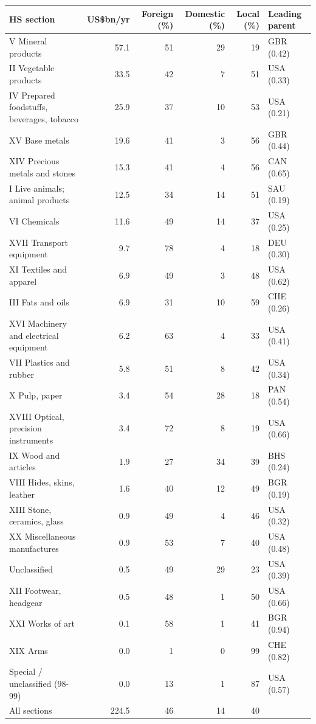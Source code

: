 \begin{tabular}{@{}p{7.2cm} r r r r l@{}}
\toprule
HS section & US\$bn/yr & Foreign (\%) & Domestic (\%) & Local (\%) & Leading parent \\
\midrule
V Mineral products & 57.1 & 51 & 29 & 19 & GBR (0.42) \\
II Vegetable products & 33.5 & 42 & 7 & 51 & USA (0.33) \\
IV Prepared foodstuffs, beverages, tobacco & 25.9 & 37 & 10 & 53 & USA (0.21) \\
XV Base metals & 19.6 & 41 & 3 & 56 & GBR (0.44) \\
XIV Precious metals and stones & 15.3 & 41 & 4 & 56 & CAN (0.65) \\
I Live animals; animal products & 12.5 & 34 & 14 & 51 & SAU (0.19) \\
VI Chemicals & 11.6 & 49 & 14 & 37 & USA (0.25) \\
XVII Transport equipment & 9.7 & 78 & 4 & 18 & DEU (0.30) \\
XI Textiles and apparel & 6.9 & 49 & 3 & 48 & USA (0.62) \\
III Fats and oils & 6.9 & 31 & 10 & 59 & CHE (0.26) \\
XVI Machinery and electrical equipment & 6.2 & 63 & 4 & 33 & USA (0.41) \\
VII Plastics and rubber & 5.8 & 51 & 8 & 42 & USA (0.34) \\
X Pulp, paper & 3.4 & 54 & 28 & 18 & PAN (0.54) \\
XVIII Optical, precision instruments & 3.4 & 72 & 8 & 19 & USA (0.66) \\
IX Wood and articles & 1.9 & 27 & 34 & 39 & BHS (0.24) \\
VIII Hides, skins, leather & 1.6 & 40 & 12 & 49 & BGR (0.19) \\
XIII Stone, ceramics, glass & 0.9 & 49 & 4 & 46 & USA (0.32) \\
XX Miscellaneous manufactures & 0.9 & 53 & 7 & 40 & USA (0.48) \\
Unclassified & 0.5 & 49 & 29 & 23 & USA (0.39) \\
XII Footwear, headgear & 0.5 & 48 & 1 & 50 & USA (0.66) \\
XXI Works of art & 0.1 & 58 & 1 & 41 & BGR (0.94) \\
XIX Arms & 0.0 & 1 & 0 & 99 & CHE (0.82) \\
Special / unclassified (98-99) & 0.0 & 13 & 1 & 87 & USA (0.57) \\
\midrule
All sections & 224.5 & 46 & 14 & 40 & \\
\bottomrule
\end{tabular}
